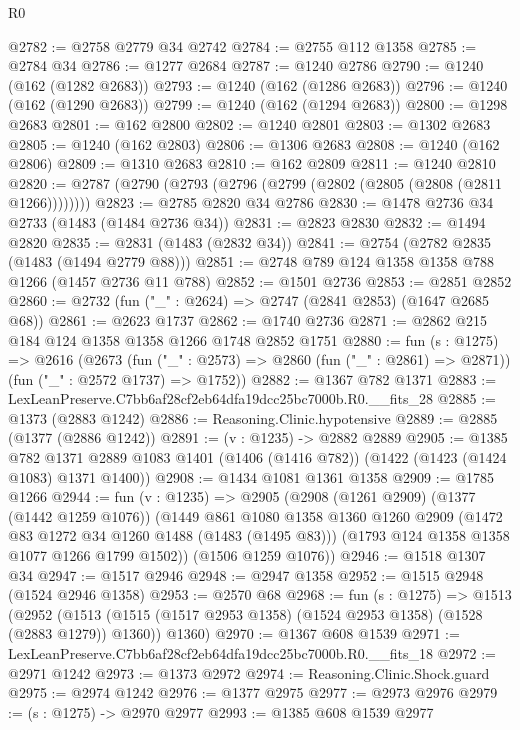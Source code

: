 \begin{lexlean}{R0}
\begin{coremodule}
@2782 := @2758 @2779 @34 @2742
@2784 := @2755 @112 @1358
@2785 := @2784 @34
@2786 := @1277 @2684
@2787 := @1240 @2786
@2790 := @1240 (@162 (@1282 @2683))
@2793 := @1240 (@162 (@1286 @2683))
@2796 := @1240 (@162 (@1290 @2683))
@2799 := @1240 (@162 (@1294 @2683))
@2800 := @1298 @2683
@2801 := @162 @2800
@2802 := @1240 @2801
@2803 := @1302 @2683
@2805 := @1240 (@162 @2803)
@2806 := @1306 @2683
@2808 := @1240 (@162 @2806)
@2809 := @1310 @2683
@2810 := @162 @2809
@2811 := @1240 @2810
@2820 := @2787 (@2790 (@2793 (@2796 (@2799 (@2802 (@2805 (@2808 (@2811 @1266))))))))
@2823 := @2785 @2820 @34 @2786
@2830 := @1478 @2736 @34 @2733 (@1483 (@1484 @2736 @34))
@2831 := @2823 @2830
@2832 := @1494 @2820
@2835 := @2831 (@1483 (@2832 @34))
@2841 := @2754 (@2782 @2835 (@1483 (@1494 @2779 @88)))
@2851 := @2748 @789 @124 @1358 @1358 @788 @1266 (@1457 @2736 @11 @788)
@2852 := @1501 @2736
@2853 := @2851 @2852
@2860 := @2732 (fun ("_" : @2624) => @2747 (@2841 @2853) (@1647 @2685 @68))
@2861 := @2623 @1737
@2862 := @1740 @2736
@2871 := @2862 @215 @184 @124 @1358 @1358 @1266 @1748 @2852 @1751
@2880 := fun (s : @1275) =>
  @2616
    (@2673
      (fun ("_" : @2573) => @2860 (fun ("_" : @2861) => @2871))
      (fun ("_" : @2572 @1737) => @1752))
@2882 := @1367 @782 @1371
@2883 := LexLeanPreserve.C7bb6af28cf2eb64dfa19dcc25bc7000b.R0.__fits_28
@2885 := @1373 (@2883 @1242)
@2886 := Reasoning.Clinic.hypotensive
@2889 := @2885 (@1377 (@2886 @1242))
@2891 := (v : @1235) -> @2882 @2889
@2905 := @1385
    @782
    @1371
    @2889
    @1083
    @1401
    (@1406 (@1416 @782))
    (@1422 (@1423 (@1424 @1083) @1371 @1400))
@2908 := @1434 @1081 @1361 @1358
@2909 := @1785 @1266
@2944 := fun (v : @1235) =>
  @2905
    (@2908
      (@1261 @2909)
      (@1377 (@1442 @1259 @1076))
      (@1449
        @861
        @1080
        @1358
        @1360
        @1260
        @2909
        (@1472 @83 @1272 @34 @1260 @1488 (@1483 (@1495 @83)))
        (@1793 @124 @1358 @1358 @1077 @1266 @1799 @1502))
      (@1506 @1259 @1076))
@2946 := @1518 @1307 @34
@2947 := @1517 @2946
@2948 := @2947 @1358
@2952 := @1515 @2948 (@1524 @2946 @1358)
@2953 := @2570 @68
@2968 := fun (s : @1275) =>
  @1513
    (@2952
      (@1513 (@1515 (@1517 @2953 @1358) (@1524 @2953 @1358) (@1528 (@2883 @1279)) @1360))
      @1360)
@2970 := @1367 @608 @1539
@2971 := LexLeanPreserve.C7bb6af28cf2eb64dfa19dcc25bc7000b.R0.__fits_18
@2972 := @2971 @1242
@2973 := @1373 @2972
@2974 := Reasoning.Clinic.Shock.guard
@2975 := @2974 @1242
@2976 := @1377 @2975
@2977 := @2973 @2976
@2979 := (s : @1275) -> @2970 @2977
@2993 := @1385
    @608
    @1539
    @2977

\end{coremodule}
\end{lexlean}
